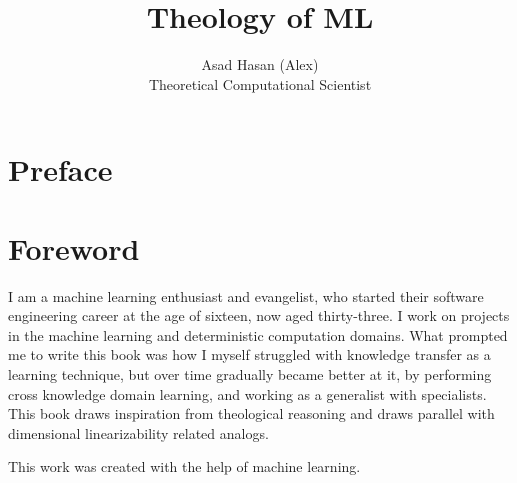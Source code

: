 \documentclass[ebook,12pt,oneside,openany]{memoir}
\title{Theology of ML}
\author{Asad Hasan (Alex) \\ Theoretical Computational Scientist}
\begin{document}
\makeatletter
\renewcommand{\@date}{} %
\makeatother
\maketitle
\chapter*{Preface}
\vspace*{\fill} %


\vspace*{\fill} %
\chapter*{Foreword}
I am a machine learning enthusiast and evangelist, who started their software engineering career at the age of sixteen, now aged thirty-three. I work on projects in the machine learning and deterministic computation domains. What prompted me to write this book was how I myself struggled with knowledge transfer as a learning technique, but over time gradually became better at it, by performing cross knowledge domain learning, and working as a generalist with specialists. This book draws inspiration from theological reasoning and draws parallel with dimensional linearizability related analogs.

This work was created with the help of machine learning.
\end{document}
